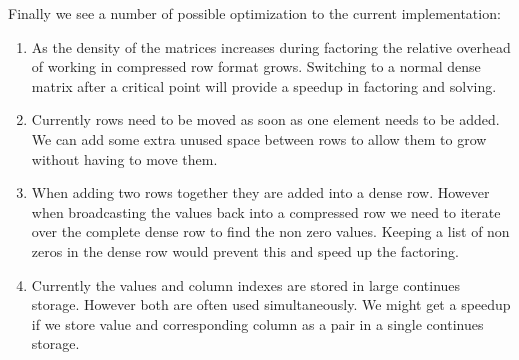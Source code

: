 \documentclass[10pt]{article}
\begin{document}
Finally we see a number of possible optimization to the current implementation:
\begin{enumerate}
\item As the density of the matrices increases during factoring the relative overhead of working in compressed row format grows. Switching to a normal dense matrix after a critical point will provide a speedup in factoring and solving. 

\item Currently rows need to be moved as soon as one element needs to be added. We can add some extra unused space between rows to allow them to grow without having to move them. 

\item When adding two rows together they are added into a dense row. However when broadcasting the values back into a compressed row we need to iterate over the complete dense row to find the non zero values. Keeping a list of non zeros in the dense row would prevent this and speed up the factoring.

\item Currently the values and column indexes are stored in large continues storage. However both are often used simultaneously. We might get a speedup if we store value and corresponding column as a pair in a single continues storage. 
\end{enumerate}

\clearpage


\end{document}
